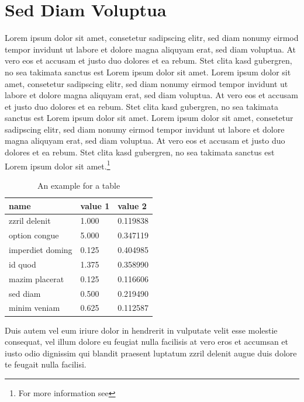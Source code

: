 \section{Sed Diam Voluptua}
Lorem ipsum dolor sit amet, consetetur sadipscing elitr, sed diam nonumy eirmod tempor invidunt ut labore et dolore magna aliquyam erat, sed diam voluptua. At vero eos et accusam et justo duo dolores et ea rebum. Stet clita kasd gubergren, no sea takimata sanctus est Lorem ipsum dolor sit amet. Lorem ipsum dolor sit amet, consetetur sadipscing elitr, sed diam nonumy eirmod tempor invidunt ut labore et dolore magna aliquyam erat, sed diam voluptua. At vero eos et accusam et justo duo dolores et ea rebum. Stet clita kasd gubergren, no sea takimata sanctus est Lorem ipsum dolor sit amet. Lorem ipsum dolor sit amet, consetetur sadipscing elitr, sed diam nonumy eirmod tempor invidunt ut labore et dolore magna aliquyam erat, sed diam voluptua. At vero eos et accusam et justo duo dolores et ea rebum. Stet clita kasd gubergren, no sea takimata sanctus est Lorem ipsum dolor sit amet.\footnote{For more information see }

\begin{table}[ht]
    \centering
    \begin{tabular}{@{}lll@{}}
    \toprule
    \textbf{name} & \textbf{value 1} & \textbf{value 2} \\ 
    \midrule
    zzril delenit & 1.000 & 0.119838 \\
    option congue & 5.000 & 0.347119 \\
    imperdiet doming & 0.125 & 0.404985 \\
    id quod & 1.375 & 0.358990 \\
    mazim placerat & 0.125 & 0.116606 \\
    sed diam & 0.500 & 0.219490 \\
    minim veniam & 0.625 & 0.112587 \\
    \bottomrule
    \end{tabular}
    \caption{An example for a table}
    \label{tab:table1}
\end{table}


Duis autem vel eum iriure dolor in hendrerit in vulputate velit esse molestie consequat, vel illum dolore eu feugiat nulla facilisis at vero eros et accumsan et iusto odio dignissim qui blandit praesent luptatum zzril delenit augue duis dolore te feugait nulla facilisi.

